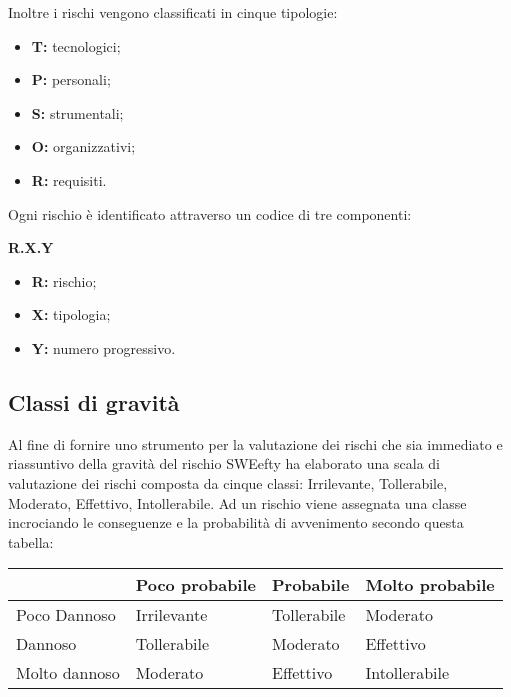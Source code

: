 Inoltre i rischi vengono classificati in cinque tipologie:
\begin{itemize}
	\item \textbf{T:} tecnologici;
	\item \textbf{P:} personali;
	\item \textbf{S:} strumentali;
	\item \textbf{O:} organizzativi;
	\item \textbf{R:} requisiti.
\end{itemize}

Ogni rischio è identificato attraverso un codice di tre componenti:
\begin{center}
	\textbf{R.X.Y}
\end{center}
\begin{itemize}
	\item \textbf{R:} rischio; 
	\item \textbf{X:} tipologia;
	\item \textbf{Y:} numero progressivo. 
\end{itemize}


\subsection{Classi di gravità}
Al fine di fornire uno strumento per la valutazione dei rischi che sia immediato e riassuntivo della gravità del rischio SWEefty ha elaborato una scala di valutazione dei rischi composta da cinque classi: Irrilevante, Tollerabile, Moderato, Effettivo, Intollerabile. Ad un rischio viene assegnata una classe incrociando le conseguenze e la probabilità di avvenimento secondo questa tabella:
\begin{table}[H]
	\centering
	\begin{tabular}{|C{3cm}|C{3cm}|C{3cm}|C{3cm}|}
		\hline
		~             & Poco probabile & Probabile   & Molto probabile \\ \hline
		Poco Dannoso  & Irrilevante    & Tollerabile & Moderato        \\ \hline
		Dannoso       & Tollerabile    & Moderato    & Effettivo       \\ \hline
		Molto dannoso & Moderato       & Effettivo   & Intollerabile   \\
		\hline
	\end{tabular}
\end{table}

